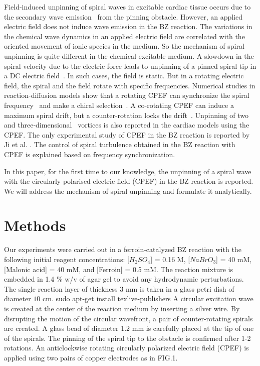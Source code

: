 \documentclass[%
 reprint,
 amsmath,amssymb,
 aps,
prb,
]{revtex4-2}
\begin{document}
Field-induced unpinning of spiral waves in excitable cardiac tissue occurs due to the secondary wave emission~\cite{pumir2007wave} from the pinning obstacle. However, an applied electric field does not induce wave emission in the BZ reaction. The variations in the chemical wave dynamics in an applied electric field are correlated with the oriented movement of ionic species in the medium.
So the mechanism of spiral unpinning is quite different in the chemical excitable medium. A slowdown in the spiral velocity due to the electric force leads to unpinning of a pinned spiral tip in a DC electric field~\cite{dcmechanism}. In such cases, the field is static. But in a rotating electric field, the spiral and the field rotate with specific frequencies.
Numerical studies in reaction-diffusion models show that a rotating CPEF can synchronize the spiral frequency~\cite{chen2009synchronization} and make a chiral selection~\cite{li2013chiral}.
A co-rotating CPEF can induce a maximum spiral drift, but a counter-rotation locks the drift~\cite{chen2006drift}. Unpinning of two~\cite{punacha2020theory} and three-dimensional~\cite{pan2016removal} vortices is also reported in the cardiac models using the CPEF. The only experimental study of CPEF in the BZ reaction is reported by Ji et al. \cite{ji2013experimental}. 
The control of spiral turbulence obtained in the BZ reaction with CPEF is explained based on frequency synchronization. 
 
In this paper, for the first time to our knowledge, the unpinning of a spiral wave with the circularly polarised electric field (CPEF) in the BZ reaction is reported. We will address the mechanism of spiral unpinning and formulate it analytically.
 
\section{Methods}

Our experiments were carried out in a ferroin-catalyzed BZ reaction with the following initial reagent concentrations: [$H_2SO_4$] = 0.16 M, [$NaBrO_3$] = 40 mM, [Malonic acid] = 40 mM, and [Ferroin] = 0.5 mM. The reaction mixture is embedded in 1.4 $\%$ w/v of agar gel to avoid any hydrodynamic perturbations. The single reaction layer of thickness $3$ mm is taken in a glass petri dish of diameter $10$ cm. sudo apt-get install texlive-publishers
A circular excitation wave is created at the center of the reaction medium by inserting a silver wire. By disrupting the motion of the circular wavefront, a pair of counter-rotating spirals are created. A glass bead of diameter $1.2$ mm is carefully placed at the tip of one of the spirals. The pinning of the spiral tip to the obstacle is confirmed after 1-2 rotations.
An anticlockwise rotating circularly polarized electric field (CPEF) is applied using two pairs of copper electrodes as in FIG.1. 
\end{document}
